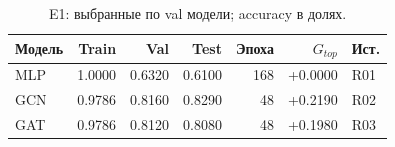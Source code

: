 \begin{table}[H]\centering\small
\setlength{\tabcolsep}{4pt}
\caption{E1: выбранные по val модели; accuracy в долях.}\label{tab:models}
\begin{tabular}{lrrrrrl}
\toprule
Модель & Train & Val & Test & Эпоха & $G_{top}$ & Ист. \\
\midrule
MLP & 1.0000 & 0.6320 & 0.6100 & 168 & +0.0000 & R01 \\
GCN & 0.9786 & 0.8160 & 0.8290 & 48 & +0.2190 & R02 \\
GAT & 0.9786 & 0.8120 & 0.8080 & 48 & +0.1980 & R03 \\
\bottomrule
\end{tabular}
\end{table}
